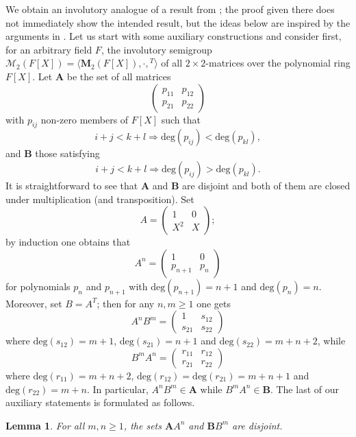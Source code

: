 \documentclass[11pt,reqno]{amsart}
\newtheorem{Lemma}[Thm]{Lemma}
\theoremstyle{remark}
\begin{document}
We obtain an involutory analogue of a result from \cite{GoMi78}; the proof given there does not immediately show the intended result, but the ideas below are inspired by the arguments in \cite{GoMi78}.
Let us start with some auxiliary constructions and consider
first, for an arbitrary field $F$, the involutory semigroup
$\mathcal{M}_2(F[X])=\langle \mathbf{M}_2(F[X]),\cdot,{}^T\rangle$
of all $2\times 2$-matrices over the polynomial ring $F[X]$. Let
$\mathbf{A}$  be the set of all
matrices
$$\begin{pmatrix}
p_{11} & p_{12}\\ p_{21}& p_{22} \end{pmatrix}$$ with $p_{ij}$
non-zero members of $F[X]$ such that
$$i+j < k+ l\Longrightarrow  \mathrm{deg}(p_{ij})< \mathrm{deg}(p_{kl}),$$ and $\mathbf{B}$ those satisfying
$$i+j <k+ l\Longrightarrow  \mathrm{deg}(p_{ij})> \mathrm{deg}(p_{kl}).$$ It is straightforward to see that $\mathbf{A}$ and $\mathbf{B}$
 are disjoint and both of them are closed under
multiplication (and transposition). Set
$$A=\begin{pmatrix} 1 & 0\\ X^2 &X\end{pmatrix};$$ by induction one
obtains that
$$A^n=\begin{pmatrix} 1 & 0 \\p_{n+1}&p_n\end{pmatrix}$$ for polynomials
$p_n$ and $p_{n+1}$
with $\mathrm{deg}(p_{n+1})=n+1$  and $\mathrm{deg}(p_n)=n$. Moreover,
set $B=A^T$; then for any $n,m\ge 1$ one gets
$$A^nB^m=\begin{pmatrix} 1 & s_{12}\\ s_{21} & s_{22}\end{pmatrix}$$ where
$\mathrm{deg}(s_{12})=m+1$, $\mathrm{deg}(s_{21})=n+1$ and
$\mathrm{deg}(s_{22})=m+n+2$, while
$$B^mA^n=\begin{pmatrix} r_{11} & r_{12} \\ r_{21} &
r_{22}\end{pmatrix}$$ where $\mathrm{deg}(r_{11})=m+n+2$,
$\mathrm{deg}(r_{12})=\mathrm{deg}(r_{21})=m+n+1$ and
$\mathrm{deg}(r_{22})=m+n$. In particular, $A^nB^m\in \mathbf{A}$
while $B^mA^n\in\mathbf{B}$. The last of our auxiliary statements is
formulated as follows.
\begin{Lemma}\label{lemma} For all $m,n\ge 1$, the sets $\mathbf{A}A^n$ and
$\mathbf{B}B^m$ are disjoint.
\end{Lemma}
\end{document}
